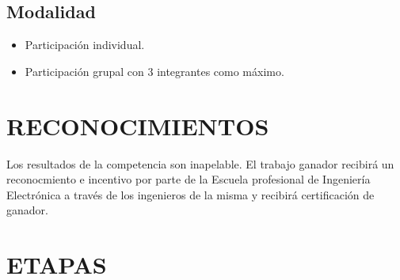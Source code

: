 \documentclass{article}
\begin{document}
\subsection{Modalidad}

\begin{itemize}
\item Participación individual.
\item Participación grupal con 3 integrantes como máximo.
\end{itemize}

\section{RECONOCIMIENTOS}

Los resultados de la competencia son inapelable. El trabajo ganador recibirá un reconocmiento e incentivo por parte de la Escuela profesional de Ingeniería Electrónica a través de los ingenieros de la misma y recibirá certificación de ganador.

\section{ETAPAS}
\end{document}
